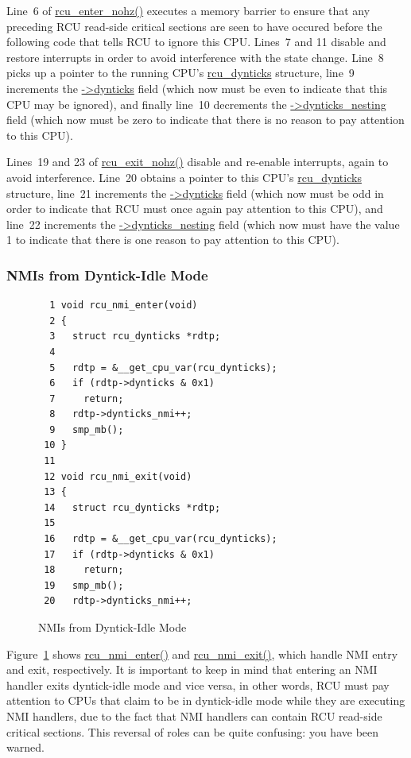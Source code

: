 Line~6 of \url{rcu_enter_nohz()} executes a memory barrier to ensure
that any preceding RCU read-side critical sections are seen to have
occured before the following code that tells RCU to ignore this CPU.
Lines~7 and 11 disable and restore interrupts in order to avoid
interference with the state change.
Line~8 picks up a pointer to the running CPU's \url{rcu_dynticks}
structure, line~9 increments the \url{->dynticks} field (which now
must be even to indicate that this CPU may be ignored), and finally line~10
decrements the \url{->dynticks_nesting} field (which now must be
zero to indicate that there is no reason to pay attention to this CPU).

Lines~19 and 23 of \url{rcu_exit_nohz()} disable and re-enable interrupts,
again to avoid interference.
Line~20 obtains a pointer to this CPU's \url{rcu_dynticks} structure,
line~21 increments the \url{->dynticks} field (which now must be odd
in order to indicate that RCU must once again pay attention to this
CPU), and line~22 increments the \url{->dynticks_nesting} field
(which now must have the value 1 to indicate that there is one
reason to pay attention to this CPU).

\subsubsection{NMIs from Dyntick-Idle Mode}
\label{app:rcuimpl:rcutreewt:NMIs from Dyntick-Idle Mode}

\begin{figure}[tbp]
{ \scriptsize
\begin{verbatim}
  1 void rcu_nmi_enter(void)
  2 {
  3   struct rcu_dynticks *rdtp;
  4 
  5   rdtp = &__get_cpu_var(rcu_dynticks);
  6   if (rdtp->dynticks & 0x1)
  7     return;
  8   rdtp->dynticks_nmi++;
  9   smp_mb();
 10 }
 11 
 12 void rcu_nmi_exit(void)
 13 {
 14   struct rcu_dynticks *rdtp;
 15 
 16   rdtp = &__get_cpu_var(rcu_dynticks);
 17   if (rdtp->dynticks & 0x1)
 18     return;
 19   smp_mb();
 20   rdtp->dynticks_nmi++;
\end{verbatim}
}
\caption{NMIs from Dyntick-Idle Mode}
\label{fig:app:rcuimpl:rcutreewt:NMIs from Dyntick-Idle Mode}
\end{figure}

Figure~\ref{fig:app:rcuimpl:rcutreewt:NMIs from Dyntick-Idle Mode}
shows \url{rcu_nmi_enter()} and \url{rcu_nmi_exit()}, which handle
NMI entry and exit, respectively.
It is important to keep in mind that entering an NMI handler
exits dyntick-idle mode and vice versa, in other words, RCU must
pay attention to CPUs that claim to be in dyntick-idle mode while
they are executing NMI handlers, due to the fact that NMI handlers
can contain RCU read-side critical sections.
This reversal of roles can be quite confusing: you have been warned.

